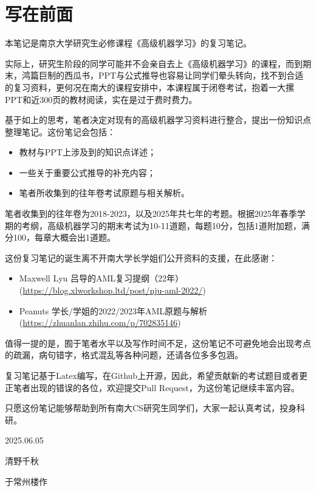 \chapter*{写在前面} 

本笔记是南京大学研究生必修课程《高级机器学习》的复习笔记。

实际上，研究生阶段的同学可能并不会亲自去上《高级机器学习》的课程，而到期末，鸿篇巨制的西瓜书，PPT与公式推导也容易让同学们晕头转向，找不到合适的复习资料，更何况在南大的课程安排中，本课程属于闭卷考试，抱着一大摞PPT和近300页的教材阅读，实在是过于费时费力。

基于如上的思考，笔者决定对现有的高级机器学习资料进行整合，提出一份知识点整理笔记。这份笔记会包括：
\begin{itemize}
    \item 教材与PPT上涉及到的知识点详述；
    \item 一些关于重要公式推导的补充内容；
    \item 笔者所收集到的往年卷考试原题与相关解析。
\end{itemize}

笔者收集到的往年卷为2018-2023，以及2025年共七年的考题。根据2025年春季学期的考纲，高级机器学习的期末考试为10-11道题，每题10分，包括1道附加题，满分100，每章大概会出1道题。

这份复习笔记的诞生离不开南大学长学姐们公开资料的支援，在此感谢：
\begin{itemize}
    \item Maxwell Lyu 吕导的AML复习提纲（22年）(\url{https://blog.xlworkshop.ltd/post/nju-aml-2022/})
    \item Peanuts 学长/学姐的2022/2023年AML原题与解析(\url{https://zhuanlan.zhihu.com/p/702835146})
\end{itemize}

值得一提的是，囿于笔者水平以及写作时间不足，这份笔记不可避免地会出现考点的疏漏，病句错字，格式混乱等各种问题，还请各位多多包涵。

复习笔记基于Latex编写，在Github上开源，因此，希望贡献新的考试题目或者更正笔者出现的错误的各位，欢迎提交Pull Request，为这份笔记继续丰富内容。

只愿这份笔记能够帮助到所有南大CS研究生同学们，大家一起认真考试，投身科研。

\begin{flushright}
	2025.06.05

    清野千秋

    于常州楼作
\end{flushright}